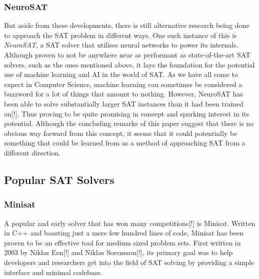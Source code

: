 \documentclass{article}
\begin{document}
\subsubsection{NeuroSAT}
But aside from these developments, there is still alternative research being done to approach the SAT problem in different ways.
One such instance of this is \textit{NeuroSAT}, a SAT solver that utilises neural networks to power its internals. Although proven
to not be anywhere near as performant as state-of-the-art SAT solvers, such as the ones mentioned above, it lays the foundation
for the potential use of machine learning and AI in the world of SAT. As we have all come to expect in Computer Science, machine
learning can sometimes be considered a buzzword for a lot of things that amount to nothing. However, NeuroSAT has been able to
solve substantially larger SAT instances than it had been trained on[!]. Thus proving to be quite promising in concept and
sparking interest in its potential. Although the concluding remarks of this paper suggest that there is no obvious way forward
from this concept, it seems that it could potentially be something that could be learned from as a method of approaching SAT from
a different direction.

\subsection{Popular SAT Solvers}
\subsubsection{Minisat}
A popular and early solver that has won many competitions[!] is Minisat. Written in C++ and boasting
just a mere few hundred lines of code, Minisat has been proven to be an effective tool for medium
sized problem sets. First written in 2003 by Niklas Een[!] and Niklas Sorensson[!], its primary goal
was to help developers and researchers get into the field of SAT solving by providing a simple
interface and minimal codebase.

\end{document}
